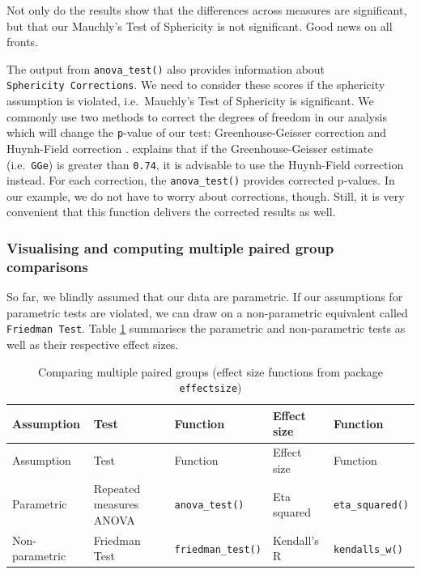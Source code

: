\documentclass[
]{book}
\begin{document}
Not only do the results show that the differences across measures are significant, but that our Mauchly's Test of Sphericity is not significant. Good news on all fronts.

The output from \texttt{anova\_test()} also provides information about \texttt{Sphericity\ Corrections}. We need to consider these scores if the sphericity assumption is violated, i.e.~Mauchly's Test of Sphericity is significant. We commonly use two methods to correct the degrees of freedom in our analysis which will change the \texttt{p}-value of our test: Greenhouse-Geisser correction \citep{greenhouse1959methods} and Huynh-Field correction \citep{huynh1976estimation}. \citet{field2013discovering} explains that if the Greenhouse-Geisser estimate (i.e.~\texttt{GGe}) is greater than \texttt{0.74}, it is advisable to use the Huynh-Field correction instead. For each correction, the \texttt{anova\_test()} provides corrected p-values. In our example, we do not have to worry about corrections, though. Still, it is very convenient that this function delivers the corrected results as well.

\hypertarget{visualising-computing-multiple-paired-group-comparisons}{%
\subsubsection{Visualising and computing multiple paired group comparisons}\label{visualising-computing-multiple-paired-group-comparisons}}

So far, we blindly assumed that our data are parametric. If our assumptions for parametric tests are violated, we can draw on a non-parametric equivalent called \texttt{Friedman\ Test}. Table \ref{tab:comparing-multiple-groups-paired} summarises the parametric and non-parametric tests as well as their respective effect sizes.

\begin{longtable}[]{@{}lllll@{}}
\caption{\label{tab:comparing-multiple-groups-paired}Comparing multiple paired groups (effect size functions from package \texttt{effectsize})}\tabularnewline
\toprule
Assumption & Test & Function & Effect size & Function \\
\midrule
\endfirsthead
\toprule
Assumption & Test & Function & Effect size & Function \\
\midrule
\endhead
Parametric & Repeated measures ANOVA & \texttt{anova\_test()} & Eta squared & \texttt{eta\_squared()} \\
Non-parametric & Friedman Test & \texttt{friedman\_test()} & Kendall's R & \texttt{kendalls\_w()} \\
\bottomrule
\end{longtable}
\end{document}
